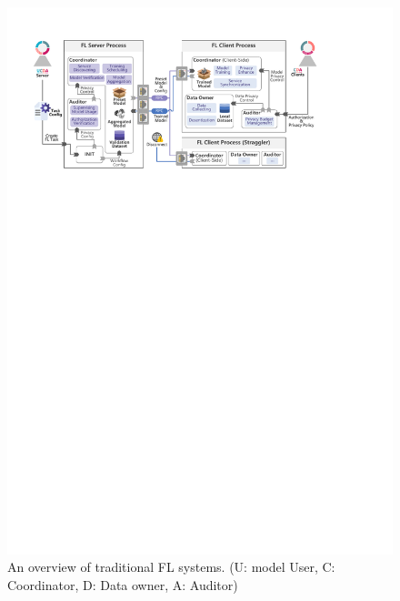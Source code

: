 \begin{figure}[t]
    \centering
    \includegraphics[width=\linewidth]{fig/fl_frame.pdf}
    \caption{An overview of traditional FL systems. (U: model User, C: Coordinator, D: Data owner, A: Auditor)}
    \Description{}
    \label{fig:fl}
  \end{figure}